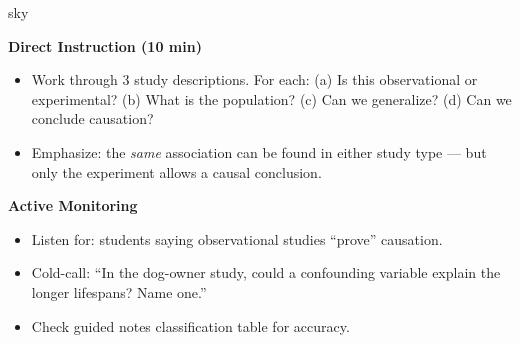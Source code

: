 \documentclass[10pt]{article}
\begin{document}
\begin{skillbox}{sky}
\begin{minipage}[t]{0.48\linewidth}
    \textbf{Direct Instruction (10 min)}
    \begin{itemize}
        \item Work through 3 study descriptions. For each: (a) Is this observational or
              experimental? (b) What is the population? (c) Can we generalize?
              (d) Can we conclude causation?
        \item Emphasize: the \emph{same} association can be found in either study
              type --- but only the experiment allows a causal conclusion.
    \end{itemize}
\end{minipage}
\hfill
\begin{minipage}[t]{0.48\linewidth}
    \textbf{Active Monitoring}
    \begin{itemize}
        \item Listen for: students saying observational studies ``prove'' causation.
        \item Cold-call: ``In the dog-owner study, could a confounding variable explain
              the longer lifespans? Name one.''
        \item Check guided notes classification table for accuracy.
    \end{itemize}
\end{minipage}
\end{skillbox}
\end{document}
